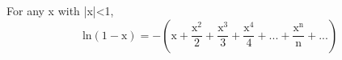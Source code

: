 For any x with |x|<1,
\[ \mathrm{ln(1-x)}
= - \left ( 
\mathrm{x}
+ \frac{\mathrm{x}^2}{2}
+ \frac{\mathrm{x}^3}{3}
+ \frac{\mathrm{x}^4}{4}
+ ...
+ \frac{\mathrm{x}^{\mathrm{n}}}{\mathrm{n}}
+ ... \right ) \]